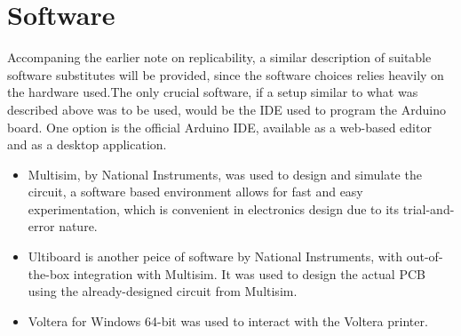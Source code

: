 \section{Software}
Accompaning the earlier note on replicability, a similar description of suitable software substitutes will be provided, since the software choices relies heavily on the hardware used.\quad The only crucial software, if a setup similar to what was described above was to be used, would be the IDE used to program the Arduino board. One option is the official Arduino IDE, available as a web-based editor and as a desktop application\cite{arduino}.
\begin{itemize}
    \item Multisim\cite{multisim}, by National Instruments, was used to design and simulate the circuit, a software based environment allows for fast and easy experimentation, which is convenient in electronics design due to its trial-and-error nature.
    \item Ultiboard is another peice of software by National Instruments, with out-of-the-box integration with Multisim. It was used to design the actual PCB using the already-designed circuit from Multisim.
    \item Voltera for Windows 64-bit was used to interact with the Voltera printer.
\end{itemize}
